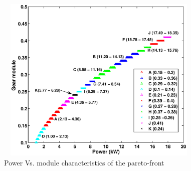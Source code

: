 \begin{figure}[ht]\begin{center}
 \includegraphics[width=100mm, height=80mm]{dia/gt11pVsm.eps}
 \caption{Power Vs. module characteristics of the pareto-front}
 \label{gt11pVsm}
\end{center}\end{figure}


